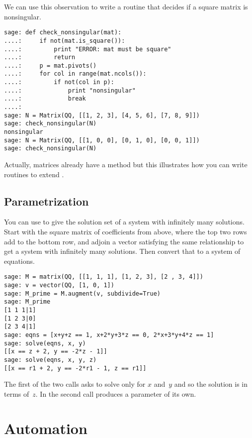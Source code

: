 We can use this observation to write a routine that decides if a 
square matrix is nonsingular.
\begin{lstlisting}
sage: def check_nonsingular(mat):
....:     if not(mat.is_square()):
....:         print "ERROR: mat must be square"
....:         return
....:     p = mat.pivots()
....:     for col in range(mat.ncols()):
....:         if not(col in p):
....:             print "nonsingular"
....:             break
....:          
sage: N = Matrix(QQ, [[1, 2, 3], [4, 5, 6], [7, 8, 9]])
sage: check_nonsingular(N)                                
nonsingular
sage: N = Matrix(QQ, [[1, 0, 0], [0, 1, 0], [0, 0, 1]])
sage: check_nonsingular(N)                                   
\end{lstlisting}
Actually, \Sage{} matrices already have a method 
but this illustrates how you can write routines to extend \Sage.



\subsection{Parametrization}
You can use  to give the solution set of a system
with infinitely many solutions.
Start with the square matrix of coefficients from above,
where the top two rows add to the bottom row,
and adjoin a vector satisfying the same relationship to get
a system with infinitely many solutions.
Then convert that to a system of equations.
\begin{lstlisting}
sage: M = matrix(QQ, [[1, 1, 1], [1, 2, 3], [2 , 3, 4]])    
sage: v = vector(QQ, [1, 0, 1])                            
sage: M_prime = M.augment(v, subdivide=True)               
sage: M_prime                  
[1 1 1|1]
[1 2 3|0]
[2 3 4|1]
sage: eqns = [x+y+z == 1, x+2*y+3*z == 0, 2*x+3*y+4*z == 1]
sage: solve(eqns, x, y)   
[[x == z + 2, y == -2*z - 1]]  
sage: solve(eqns, x, y, z)                                 
[[x == r1 + 2, y == -2*r1 - 1, z == r1]]
\end{lstlisting}
The first of the two  calls asks \Sage{} 
to solve only for $x$ and~$y$ and so the solution is in terms of~$z$.
In the second call \Sage{} produces a parameter of its own.   




\section{Automation}

